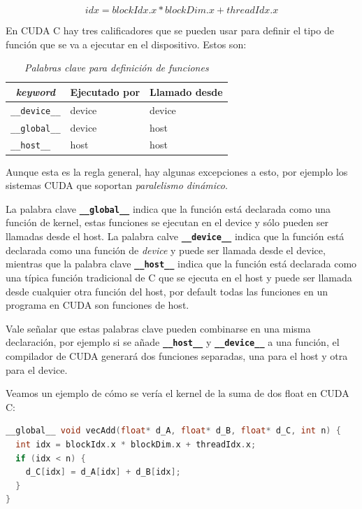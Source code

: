 \[
  idx = blockIdx.x * blockDim.x + threadIdx.x
\]

En CUDA C hay tres calificadores que se pueden usar para definir el tipo de función que se va a ejecutar en el
dispositivo. Estos son:

\begin{table}[H]
  \caption{\textit{Palabras clave para definición de funciones}}\label{tab:function_keywords}
  \begin{center}
    \begin{tabular}[c]{l|l|l}
      \hline
      \multicolumn{1}{c|}{\textbf{\textit{keyword}}} & \multicolumn{1}{c}{\textbf{Ejecutado por}} & \multicolumn{1}{c}{\textbf{Llamado
      desde}} \\
      \hline
      \texttt{\_\_device\_\_} & device & device \\
      \texttt{\_\_global\_\_} & device & host \\
      \texttt{\_\_host\_\_} & host & host \\
      \hline
    \end{tabular}
  \end{center}
\end{table}

Aunque esta es la regla general, hay algunas excepciones a esto, por ejemplo los sistemas CUDA que soportan
\textit{paralelismo dinámico}.

La palabra clave \textbf{\texttt{\_\_global\_\_}} indica que la función está declarada como una función de kernel, estas
funciones se ejecutan en el device y sólo pueden ser llamadas desde el host. La palabra calve
\textbf{\texttt{\_\_device\_\_}} indica que la función está declarada como una función de \textit{device} y puede ser
llamada desde el device, mientras que la palabra clave \textbf{\texttt{\_\_host\_\_}} indica que la función está
declarada como una típica función tradicional de C que se ejecuta en el host y puede ser llamada desde cualquier otra
función del host, por default todas las funciones en un programa en CUDA son funciones de host.

Vale señalar que estas palabras clave pueden combinarse en una misma declaración, por ejemplo si se añade
\textbf{\texttt{\_\_host\_\_}} y \textbf{\texttt{\_\_device\_\_}} a una función, el compilador de CUDA generará dos
funciones separadas, una para el host y otra para el device.

Veamos un ejemplo de cómo se vería el kernel de la suma de dos float en CUDA C:

\begin{lstlisting}[language=C]
__global__ void vecAdd(float* d_A, float* d_B, float* d_C, int n) {
  int idx = blockIdx.x * blockDim.x + threadIdx.x;
  if (idx < n) {
    d_C[idx] = d_A[idx] + d_B[idx];
  }
}
\end{lstlisting}

